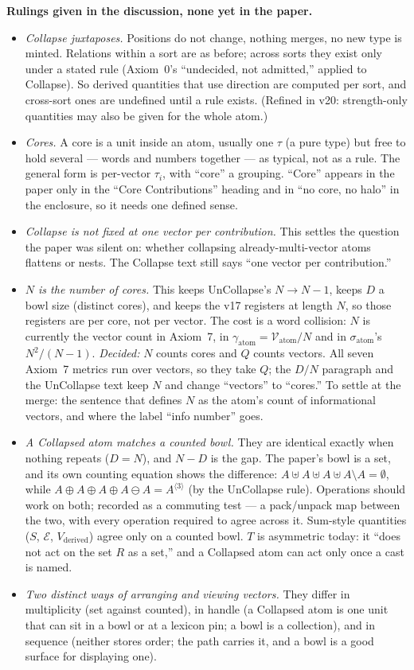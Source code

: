 \documentclass[11pt]{article}
\begin{document}
\pagebreak[4]
\textbf{Rulings given in the discussion, none yet in the paper.}\par\nopagebreak
\begin{itemize}
\item \emph{Collapse juxtaposes.} Positions do not change, nothing
merges, no new type is minted. Relations within a sort are as before;
across sorts they exist only under a stated rule (Axiom~0's
``undecided, not admitted,'' applied to Collapse). So derived
quantities that use direction are computed per sort, and cross-sort ones
are undefined until a rule exists. (Refined in v20: strength-only
quantities may also be given for the whole atom.)
\item \emph{Cores.} A core is a unit inside an atom, usually one
$\tau$ (a pure type) but free to hold several --- words and numbers
together --- as typical, not as a rule. The general form is
per-vector $\tau_i$, with ``core'' a grouping. ``Core'' appears in
the paper only in the ``Core Contributions'' heading and in ``no
core, no halo'' in the enclosure, so it needs one defined sense.
\item \emph{Collapse is not fixed at one vector per contribution.}
This settles the question the paper was silent on: whether collapsing
already-multi-vector atoms flattens or nests. The Collapse text still
says ``one vector per contribution.''
\item \emph{$N$ is the number of cores.} This keeps UnCollapse's
$N\to N-1$, keeps $D$ a bowl size (distinct cores), and keeps the v17
registers at length $N$, so those registers are per core, not per
vector. The cost is a word collision: $N$ is currently the vector
count in Axiom~7, in $\gamma_{\text{atom}}=\mathcal V_{\text{atom}}/N$
and in $\sigma_{\text{atom}}$'s $N^2/(N-1)$. \emph{Decided:} $N$ counts cores and $Q$ counts vectors. All seven
Axiom~7 metrics run over vectors, so they take $Q$; the $D/N$
paragraph and the UnCollapse text keep $N$ and change ``vectors'' to
``cores.'' To settle at the merge: the sentence that defines $N$ as the
atom's count of informational vectors, and where the label ``info
number'' goes.
\item \emph{A Collapsed atom matches a counted bowl.} They are
identical exactly when nothing repeats ($D=N$), and $N-D$ is the gap.
The paper's bowl is a set, and its own counting equation shows the
difference: $A\uplus A\uplus A\uplus A\setminus A=\emptyset$, while
$A\oplus A\oplus A\oplus A\ominus A=A^{\langle3\rangle}$ (by the
UnCollapse rule). Operations should work on both; recorded as a
commuting test --- a pack/unpack map between the two, with every
operation required to agree across it. Sum-style quantities
($S$, $\mathcal E$, $V_{\text{derived}}$) agree only on a counted
bowl. $T$ is asymmetric today: it ``does not act on the set $R$ as a
set,'' and a Collapsed atom can act only once a cast is named.
\item \emph{Two distinct ways of arranging and viewing vectors.}
They differ in multiplicity (set against counted), in handle (a
Collapsed atom is one unit that can sit in a bowl or at a lexicon
pin; a bowl is a collection), and in sequence (neither stores order;
the path carries it, and a bowl is a good surface for displaying one).
\end{itemize}
\end{document}
